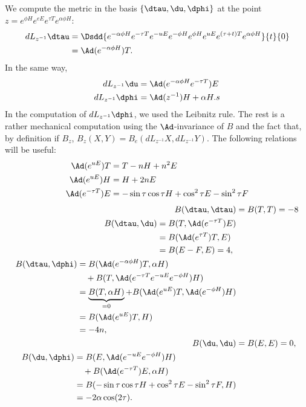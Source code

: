 We compute the metric in the basis $\{\dtau,\du,\dphi\}$ at the point $z=e^{\phi H}e^{eE}e^{\tau T}e^{\alpha\phi H}$:
\begin{equation}
	\begin{aligned}[]
   dL_{z^{-1}}\dtau&=\Dsdd{  e^{-\alpha\phi H}e^{-\tau T}e^{-uE}e^{-\phi H}e^{\phi H}e^{uE}e^{(\tau+t)T}e^{\alpha\phi H}  }{t}{0}\\
             &=\Ad(e^{-\alpha\phi H})T.
	\end{aligned}
\end{equation}
In the same way,
\begin{equation}
	\begin{aligned}[]
  dL_{z^{-1}}\du&=\Ad(e^{-\alpha\phi H}e^{-\tau T})E\\
  dL_{z^{-1}}\dphi&=\Ad(z^{-1})H+\alpha H.s
	\end{aligned}
\end{equation}
In the computation of $dL_{z^{-1}}\dphi$, we used the Leibnitz rule. The rest is a rather mechanical computation using the $\Ad$-invariance of $B$ and the fact that, by definition if $B_z$, $B_z(X,Y)=B_e(dL_{z^{-1}}X,dL_{z^{-1}}Y)$. The following relations will be useful:
\begin{subequations}
\begin{align}
  \Ad(e^{uE})T&=T-nH+n^2E\\
  \Ad(e^{uE})H&=H+2nE\\
  \Ad(e^{-\tau T})E&=-\sin\tau\cos\tau H+\cos^2\tau E-\sin^2\tau F
\end{align}
\end{subequations}
\begin{align}
  B(\dtau,\dtau)&=B(T,T)=-8\\
\begin{split}  
  B(\dtau,\du)  &=B(T,\Ad(e^{-\tau T})E)\\
                &=B(\Ad(e^{\tau T})T,E)\\
		&=B(E-F,E)=4,
\end{split}\\
\begin{split}  
     B(\dtau,\dphi)&=B(\Ad(e^{-\alpha\phi H})T,\alpha H)\\
                     &\quad +B(T, \Ad(e^{-\tau T}e^{-uE}e^{-\phi H})H  )\\
		   &=\underbrace{B(T,\alpha H)}_{=0}+B( \Ad(e^{uE})T,\Ad(e^{-\phi H})H )\\
		   &=B(\Ad(e^{uE})T,H)\\
		   &=-4n,		   
\end{split}\\
  B(\du,\du)&=B(E,E)=0,\\
\begin{split}
  B(\du,\dphi)&=B(  E,\Ad(e^{-uE}e^{-\phi H})H )\\
              &\quad+B( \Ad(e^{-\tau T})E,\alpha H )\\
	      &=B(-\sin\tau\cos\tau H+\cos^2\tau E-\sin^2\tau F,H)\\
	      &=-2\alpha\cos(2\tau).
\end{split}	      	      	     
 \end{align}
 
